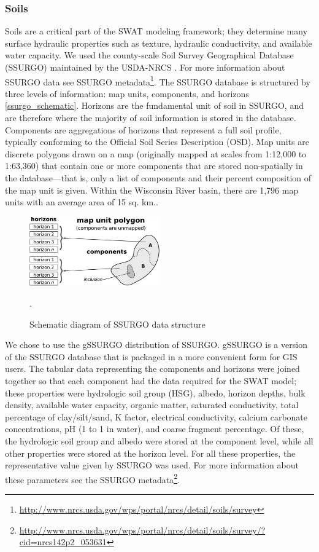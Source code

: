 \subsubsection{Soils}
Soils are a critical part of the SWAT modeling framework; they determine many
surface hydraulic properties such as texture, hydraulic conductivity, and
available water capacity. We used the county-scale Soil Survey Geographical
Database (SSURGO) maintained by the USDA-NRCS \cite{staff_gridded_2014}. For more information about SSURGO
data see SSURGO metadata\footnote{\url{http://www.nrcs.usda.gov/wps/portal/nrcs/detail/soils/survey}}.
The SSURGO database is structured by three levels of information: map units,
components, and horizons \ref{ssurgo_schematic}. Horizons are the fundamental unit of soil in SSURGO, and are
therefore where the majority of soil information is stored in the database.
Components are aggregations of horizons that represent a full soil profile,
typically conforming to the Official Soil Series Description (OSD). Map units
are discrete polygons drawn on a map (originally mapped at scales from 1:12,000
to 1:63,360) that contain one or more components that are stored non-spatially
in the database---that is, only a list of components and their percent
composition of the map unit is given. Within the Wisconsin River basin, there
are 1,796 map units with an average area of 15 sq. km..

\begin{figure}[h]
  \centering
    \includegraphics[width=0.5\textwidth]{./img/ssurgo_data_structure_schematic.jpeg}
	\caption[Schematic diagram of SSURGO data structure]{Schematic diagram of SSURGO data structure \cite{gatzke_aggregation_2011}}.
	\label{fig:ssurgo_shematic}
\end{figure}

We chose to use the gSSURGO distribution of SSURGO. gSSURGO is a version of the SSURGO database that is packaged in a more
convenient form for GIS users. The tabular data representing the components and
horizons were joined together so that each component had the data required for
the SWAT model; these properties were hydrologic soil group (HSG), albedo,
horizon depths, bulk density, available water capacity, organic matter,
saturated conductivity, total percentage of clay/silt/sand, K factor,
electrical conductivity, calcium carbonate concentrations, pH (1 to 1 in water),
and coarse fragment percentage. Of these, the hydrologic soil group and albedo
were stored at the component level, while all other properties were stored at
the horizon level. For all these properties, the representative value given by
SSURGO was used. For more information about these parameters see the SSURGO
metadata\footnote{\url{http://www.nrcs.usda.gov/wps/portal/nrcs/detail/soils/survey/?cid=nrcs142p2_053631}}.

